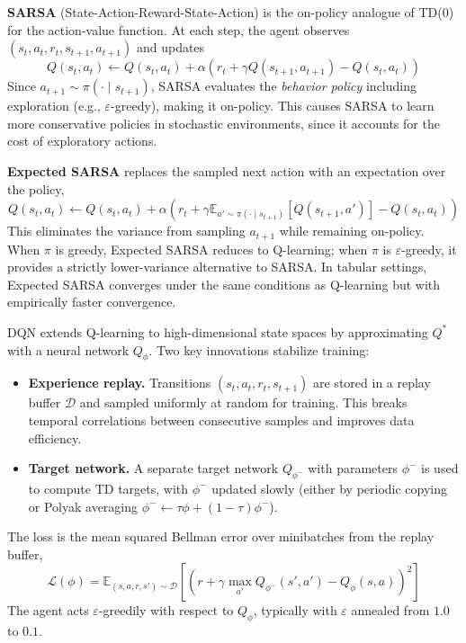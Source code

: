 \documentclass[11pt, letterpaper]{article}
\begin{document}
\begin{concept}
    \textbf{SARSA} (State-Action-Reward-State-Action) is the on-policy analogue of TD(0) for the action-value function. At each step, the agent observes \((s_t, a_t, r_t, s_{t+1}, a_{t+1})\) and updates
    \[
        Q(s_t, a_t) \leftarrow Q(s_t, a_t) + \alpha \left( r_t + \gamma Q(s_{t+1}, a_{t+1}) - Q(s_t, a_t) \right)
    \]
    Since \(a_{t+1} \sim \pi(\cdot \mid s_{t+1})\), SARSA evaluates the \textit{behavior policy} including exploration (e.g., \(\varepsilon\)-greedy), making it on-policy. This causes SARSA to learn more conservative policies in stochastic environments, since it accounts for the cost of exploratory actions.

    \textbf{Expected SARSA} replaces the sampled next action with an expectation over the policy,
    \[
        Q(s_t, a_t) \leftarrow Q(s_t, a_t) + \alpha \left( r_t + \gamma \mathbb{E}_{a' \sim \pi(\cdot \mid s_{t+1})}[Q(s_{t+1}, a')] - Q(s_t, a_t) \right)
    \]
    This eliminates the variance from sampling \(a_{t+1}\) while remaining on-policy. When \(\pi\) is greedy, Expected SARSA reduces to Q-learning; when \(\pi\) is \(\varepsilon\)-greedy, it provides a strictly lower-variance alternative to SARSA. In tabular settings, Expected SARSA converges under the same conditions as Q-learning but with empirically faster convergence.
\end{concept}

\begin{concept}
    DQN extends Q-learning to high-dimensional state spaces by approximating \(Q^*\) with a neural network \(Q_\phi\). Two key innovations stabilize training:
    \begin{itemize}
        \item \textbf{Experience replay.} Transitions \((s_t, a_t, r_t, s_{t+1})\) are stored in a replay buffer \(\mathcal{D}\) and sampled uniformly at random for training. This breaks temporal correlations between consecutive samples and improves data efficiency.
        \item \textbf{Target network.} A separate target network \(Q_{\phi^-}\) with parameters \(\phi^-\) is used to compute TD targets, with \(\phi^-\) updated slowly (either by periodic copying or Polyak averaging \(\phi^- \leftarrow \tau \phi + (1 - \tau)\phi^-\)).
    \end{itemize}
    The loss is the mean squared Bellman error over minibatches from the replay buffer,
    \[
        \mathcal{L}(\phi) = \mathbb{E}_{(s,a,r,s') \sim \mathcal{D}} \left[ \left( r + \gamma \max_{a'} Q_{\phi^-}(s', a') - Q_\phi(s, a) \right)^2 \right]
    \]
    The agent acts \(\varepsilon\)-greedily with respect to \(Q_\phi\), typically with \(\varepsilon\) annealed from \(1.0\) to \(0.1\).
\end{concept}
\end{document}
